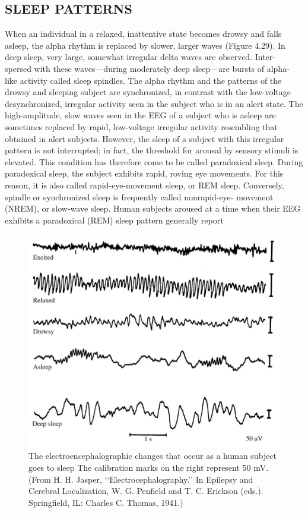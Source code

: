 \subsection{SLEEP PATTERNS}

When an individual in a relaxed, inattentive state becomes drowsy and falls
asleep, the alpha rhythm is replaced by slower, larger waves (Figure 4.29). In
deep sleep, very large, somewhat irregular delta waves are observed. Inter-
spersed with these waves—during moderately deep sleep—are bursts of alpha-
like activity called sleep spindles. The alpha rhythm and the patterns of the
drowsy and sleeping subject are synchronized, in contrast with the low-voltage
desynchronized, irregular activity seen in the subject who is in an alert state.
The high-amplitude, slow waves seen in the EEG of a subject who is asleep
are sometimes replaced by rapid, low-voltage irregular activity resembling that
obtained in alert subjects. However, the sleep of a subject with this irregular
pattern is not interrupted; in fact, the threshold for arousal by sensory stimuli is
elevated. This condition has therefore come to be called paradoxical sleep.
During paradoxical sleep, the subject exhibits rapid, roving eye movements.
For this reason, it is also called rapid-eye-movement sleep, or REM sleep.
Conversely, spindle or synchronized sleep is frequently called nonrapid-eye-
movement (NREM), or slow-wave sleep. Human subjects aroused at a time
when their EEG exhibits a paradoxical (REM) sleep pattern generally report

\begin{figure}
\centering
\includegraphics[width=0.7\linewidth]{figura_7.png} 
\caption{The electroencephalographic changes that occur as a human subject
goes to sleep The calibration marks on the right represent 50 mV. (From H.
H. Jasper, ‘‘Electrocephalography.’’ In Epilepsy and Cerebral Localization, W.
G. Penfield and T. C. Erickson (eds.). Springfield, IL: Charles C. Thomas,
1941.)}
\end{figure}

